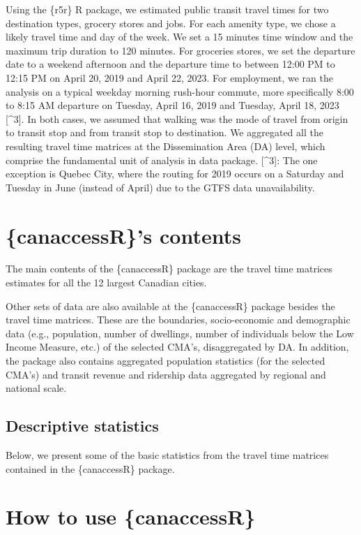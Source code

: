 \documentclass[Royal,times,sageh]{sagej}
\begin{document}
Using the \{r5r\} R package, we estimated public transit travel times
for two destination types, grocery stores and jobs. For each amenity
type, we chose a likely travel time and day of the week. We set a 15
minutes time window and the maximum trip duration to 120 minutes. For
groceries stores, we set the departure date to a weekend afternoon and
the departure time to between 12:00 PM to 12:15 PM on April 20, 2019 and
April 22, 2023. For employment, we ran the analysis on a typical weekday
morning rush-hour commute, more specifically 8:00 to 8:15 AM departure
on Tuesday, April 16, 2019 and Tuesday, April 18, 2023 {[}\^{}3{]}. In
both cases, we assumed that walking was the mode of travel from origin
to transit stop and from transit stop to destination. We aggregated all
the resulting travel time matrices at the Dissemination Area (DA) level,
which comprise the fundamental unit of analysis in data package.
{[}\^{}3{]}: The one exception is Quebec City, where the routing for
2019 occurs on a Saturday and Tuesday in June (instead of April) due to
the GTFS data unavailability.

\section{\{canaccessR\}'s contents}\label{canaccessrs-contents}

The main contents of the \{canaccessR\} package are the travel time
matrices estimates for all the 12 largest Canadian cities.

Other sets of data are also available at the \{canaccessR\} package
besides the travel time matrices. These are the boundaries,
socio-economic and demographic data (e.g., population, number of
dwellings, number of individuals below the Low Income Measure, etc.) of
the selected CMA's, disaggregated by DA. In addition, the package also
contains aggregated population statistics (for the selected CMA's) and
transit revenue and ridership data aggregated by regional and national
scale.

\subsection{Descriptive statistics}\label{descriptive-statistics}

Below, we present some of the basic statistics from the travel time
matrices contained in the \{canaccessR\} package.

\section{How to use \{canaccessR\}}\label{how-to-use-canaccessr}
\end{document}
